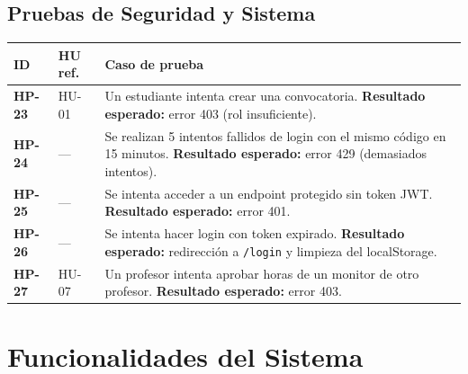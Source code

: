 \documentclass[12pt,a4paper]{article}
\begin{document}
\subsection{Pruebas de Seguridad y Sistema}

\begin{longtable}{>{\bfseries}p{1.2cm} p{2.5cm} p{9.5cm}}
  \toprule
  \textbf{ID} & \textbf{HU ref.} & \textbf{Caso de prueba} \\
  \midrule

  HP-23 & HU-01 & Un estudiante intenta crear una convocatoria. \textbf{Resultado esperado:} error 403 (rol insuficiente). \\[3pt]
  HP-24 & — & Se realizan 5 intentos fallidos de login con el mismo código en 15 minutos. \textbf{Resultado esperado:} error 429 (demasiados intentos). \\[3pt]
  HP-25 & — & Se intenta acceder a un endpoint protegido sin token JWT. \textbf{Resultado esperado:} error 401. \\[3pt]
  HP-26 & — & Se intenta hacer login con token expirado. \textbf{Resultado esperado:} redirección a \texttt{/login} y limpieza del localStorage. \\[3pt]
  HP-27 & HU-07 & Un profesor intenta aprobar horas de un monitor de otro profesor. \textbf{Resultado esperado:} error 403. \\

  \bottomrule
\end{longtable}

\newpage
\section{Funcionalidades del Sistema}
\end{document}
